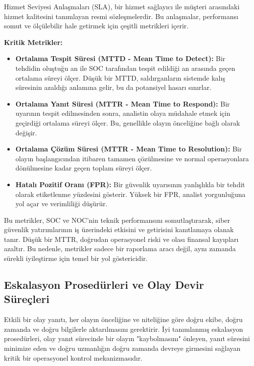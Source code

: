 Hizmet Seviyesi Anlaşmaları (SLA), bir hizmet sağlayıcı ile müşteri arasındaki hizmet kalitesini tanımlayan resmi sözleşmelerdir. Bu anlaşmalar, performansı somut ve ölçülebilir hale getirmek için çeşitli metrikleri içerir.

\textbf{Kritik Metrikler:}

\begin{itemize}
    \item \textbf{Ortalama Tespit Süresi (MTTD - Mean Time to Detect):} Bir tehdidin oluştuğu an ile SOC tarafından tespit edildiği an arasında geçen ortalama süreyi ölçer. Düşük bir MTTD, saldırganların sistemde kalış süresinin azaldığı anlamına gelir, bu da potansiyel hasarı sınırlar.
    \item \textbf{Ortalama Yanıt Süresi (MTTR - Mean Time to Respond):} Bir uyarının tespit edilmesinden sonra, analistin olaya müdahale etmek için geçirdiği ortalama süreyi ölçer. Bu, genellikle olayın önceliğine bağlı olarak değişir.
    \item \textbf{Ortalama Çözüm Süresi (MTTR - Mean Time to Resolution):} Bir olayın başlangıcından itibaren tamamen çözülmesine ve normal operasyonlara dönülmesine kadar geçen toplam süreyi ölçer.
    \item \textbf{Hatalı Pozitif Oranı (FPR):} Bir güvenlik uyarısının yanlışlıkla bir tehdit olarak etiketlenme yüzdesini gösterir. Yüksek bir FPR, analist yorgunluğuna yol açar ve verimliliği düşürür.
\end{itemize}

Bu metrikler, SOC ve NOC'nin teknik performansını somutlaştırarak, siber güvenlik yatırımlarının iş üzerindeki etkisini ve getirisini kanıtlamaya olanak tanır. Düşük bir MTTR, doğrudan operasyonel riski ve olası finansal kayıpları azaltır. Bu nedenle, metrikler sadece bir raporlama aracı değil, aynı zamanda sürekli iyileştirme için temel bir yol göstericidir.

\subsection{Eskalasyon Prosedürleri ve Olay Devir Süreçleri}

Etkili bir olay yanıtı, her olayın önceliğine ve niteliğine göre doğru ekibe, doğru zamanda ve doğru bilgilerle aktarılmasını gerektirir. İyi tanımlanmış eskalasyon prosedürleri, olay yanıt sürecinde bir olayın "kaybolmasını" önleyen, yanıt süresini minimize eden ve doğru uzmanlığın doğru zamanda devreye girmesini sağlayan kritik bir operasyonel kontrol mekanizmasıdır.


